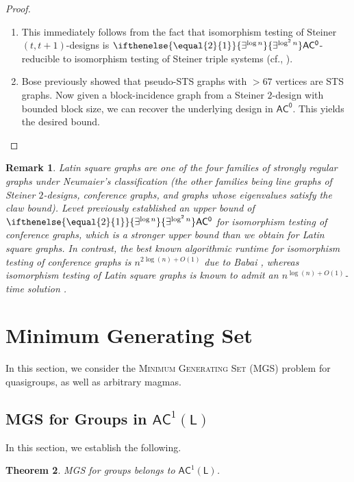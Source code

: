 \documentclass{article}
\newtheorem{theorem}{Theorem}\newtheorem{lemma}[theorem]{Lemma}\newtheorem{proposition}[theorem]{Proposition}\newtheorem{corollary}[theorem]{Corollary}\newtheorem{definition}[theorem]{Definition}\newtheorem{claim}[theorem]{Claim}\newtheorem{remark}[theorem]{Remark}\newtheorem{observation}[theorem]{Observation}\newtheorem{conjecture}[theorem]{Conjecture}\newtheorem{example}[theorem]{Example}
\newcommand{\algprobm}[1]{\textsc{#1}\xspace}
\newcommand{\betacc}[1]{\ifthenelse{\equal{#1}{1}}{\exists^{\log n}}{\exists^{\log^{#1}n}}} %
\newcommand*{\ComplexityClass}[1]{\ensuremath{\mathsf{#1}}\xspace}
\newcommand*{\LogSpace}{\ComplexityClass{L}}
\newcommand{\AC}{\ComplexityClass{AC}}
\newcommand{\ACz}{\ComplexityClass{AC^0}}
\begin{document}
\begin{proof}
\begin{enumerate}[label=(\alph*)]
\item This immediately follows from the fact that  isomorphism testing of Steiner $(t,t+1)$-designs is $\betacc{2}\ACz$-reducible to isomorphism testing of Steiner triple systems \cite{BabaiWilmes} (cf., \cite[Corollary~4.11]{LevetLatinSquares}).

\item Bose \cite{Bose} previously showed that pseudo-STS graphs with $> 67$ vertices are STS graphs. Now given a block-incidence graph from a Steiner $2$-design with bounded block size, we can recover the underlying design in \ACz \cite[Proposition~4.7]{LevetLatinSquares}. This yields the desired bound.\qedhere
\end{enumerate}
\end{proof}

\begin{remark} \label{rmk:LatinSquares}
 Latin square graphs are one of the four families of strongly regular graphs under Neumaier's classification \cite{Neumaier} (the other families being line graphs of Steiner $2$-designs, conference graphs, and graphs whose eigenvalues satisfy the claw bound). Levet \cite{LevetLatinSquares} previously established an upper bound of $\betacc{2}\ACz$ for isomorphism testing of conference graphs, which is a stronger upper bound than we obtain for Latin square graphs. In contrast, the best known algorithmic runtime for isomorphism testing of conference graphs is $n^{2\log(n) + O(1)}$ due to Babai \cite{BabaiCanonicalLabeling1}, whereas isomorphism testing of Latin square graphs is known to admit an $n^{\log(n) + O(1)}$-time solution \cite{MillerTarjan}.
\end{remark}


\section{Minimum Generating Set}

In this section, we consider the \algprobm{Minimum Generating Set} (\algprobm{MGS}) problem for quasigroups, as well as arbitrary magmas.

\subsection{MGS for Groups in \texorpdfstring{$\AC^1(\LogSpace)$}{AC1(LogSpace)}}

In this section, we establish the following.

\begin{theorem} \label{thm:MGSSAC2}
\algprobm{MGS} for groups belongs to $\AC^{1}(\LogSpace)$.
\end{theorem}
\end{document}
